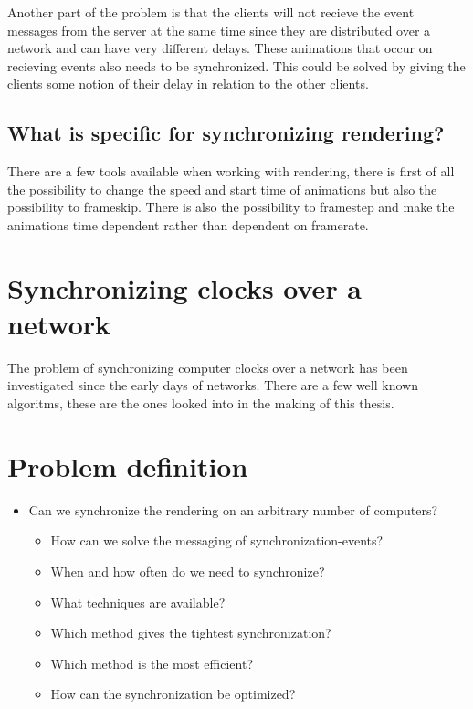 Another part of the problem is that the clients will not recieve the event messages from the server at the same time since they are distributed over a network and can have very different delays. These animations that occur on recieving events also needs to be synchronized. This could be solved by giving the clients some notion of their delay in relation to the other clients. 

\subsection{What is specific for synchronizing rendering?}
There are a few tools available when working with rendering, there is first of all the possibility to change the speed and start time of animations but also the possibility to frameskip. There is also the possibility to framestep and make the animations time dependent rather than dependent on framerate.

\section{Synchronizing clocks over a network}
The problem of synchronizing computer clocks over a network has been investigated since the early days of networks. There are a few well known algoritms, these are the ones looked into in the making of this thesis. 





\section{Problem definition}
\label{sec:problem_definition}

\begin{itemize}
  \item Can we synchronize the rendering on an arbitrary number of computers?
  \begin{itemize}
    \item How can we solve the messaging of synchronization-events?
  	\item When and how often do we need to synchronize?
    \item What techniques are available?
    \item Which method gives the tightest synchronization? %
    \item Which method is the most efficient?
  	\item How can the synchronization be optimized?
  \end{itemize}
\end{itemize}
